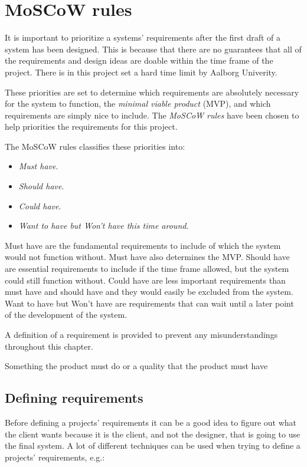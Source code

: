 \section{MoSCoW rules}

It is important to prioritize a systems' requirements after the first draft of a system has been designed.
This is because that there are no guarantees that all of the requirements and design ideas are doable within the time frame of the project.
There is in this project set a hard time limit by Aalborg Univerity.

These priorities are set to determine which requirements are absolutely necessary for the system to function, the \textit{minimal viable product} (MVP), and which requirements are simply nice to include.
The \textit{MoSCoW rules} have been chosen to help priorities the requirements for this project. 

The MoSCoW rules classifies these priorities into: \cite{Benyon}

\begin{itemize}
        \item \textit{Must have}.
        \item \textit{Should have}.
        \item \textit{Could have}.
        \item \textit{Want to have but Won’t have this time around}.
\end{itemize}

Must have are the fundamental requirements to include of which the system would not function without.
Must have also determines the MVP.
Should have are essential requirements to include if the time frame allowed, but the system could still function without.
Could have are less important requirements than must have and should have and they would easily be excluded from the system.
Want to have but Won't have are requirements that can wait until a later point of the development of the system. \cite{Benyon}

A definition of a requirement is provided to prevent any misunderstandings throughout this chapter. \cite{Benyon}

\begin{defn}
Something the product must do or a quality that the product must have
\end{defn}

\subsection{Defining requirements}
Before defining a projects' requirements it can be a good idea to figure out what the client wants because it is the client, and not the designer, that is going to use the final system.
A lot of different techniques can be used when trying to define a projects' requirements, e.g.:


